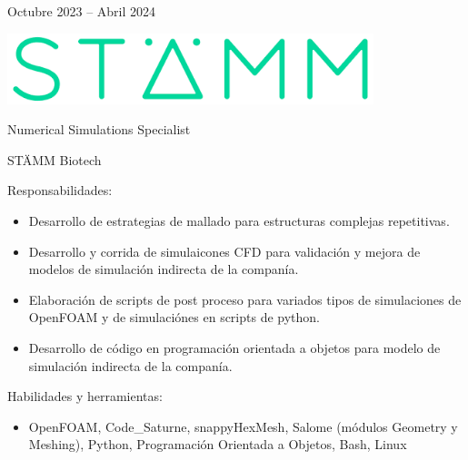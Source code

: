 \documentclass[a4paper,10pt]{article}
\newlength{\cvcolumngapwidth}
\newlength{\cvleftcolumnwidth}
\newlength{\cvrightcolumnwidth}
\newcommand{\cvtitlestyle}[1]{{\large\cvtitlefont\textcolor{cvtitlecolor}{#1}}}
\newcommand{\cvsubtitlestyle}[1]{{\cvtitlefont\textcolor{cvtitlecolor}{#1}}}
\newcommand{\cvdurationstyle}[1]{{\small\cvdurationfont\textcolor{cvdurationcolor}{#1}}}
\newlength{\cvafteritemskipamount}
\newlength{\cvaftertitleskipamount}
\newlength{\cvparskip}
\newcommand{\cvitem}[2]{
    \begin{minipage}[t]{\cvleftcolumnwidth}
        \raggedleft #1
    \end{minipage}%
    \hspace{\cvcolumngapwidth}%
    \begin{minipage}[t]{\cvrightcolumnwidth}
        \setlength{\parskip}{\cvparskip} #2
    \end{minipage}

    \vspace{\cvafteritemskipamount}
}
\newcommand{\cvtitle}[1]{
    \cvtitlestyle{#1}

    \vspace{\cvaftertitleskipamount}
    \vspace{-\cvparskip}
}
\begin{document}
\cvitem{
	\cvdurationstyle{Octubre 2023 -- Abril 2024}
}{
	\begin{minipage}{0.1\textwidth}
		\centering
		\includegraphics[width=0.8\textwidth]{../logos-photos/Logo_STAMM.png}   
	\end{minipage}
	\cvtitle{Numerical Simulations Specialist}
	
	\cvsubtitlestyle{STÄMM Biotech}

    Responsabilidades:
    \begin{itemize}
        \item Desarrollo de estrategias de mallado para estructuras complejas repetitivas.
        \item Desarrollo y corrida de simulaicones CFD para validación y mejora de modelos de simulación
            indirecta de la companía.
        \item Elaboración de scripts de post proceso para variados tipos de simulaciones de OpenFOAM y de simulaciónes
            en scripts de python.
        \item Desarrollo de código en programación orientada a objetos para modelo de simulación indirecta de la
            companía.
    \end{itemize}

    Habilidades y herramientas:
    \begin{itemize}
        \item OpenFOAM, Code\_Saturne, snappyHexMesh, Salome (módulos Geometry y Meshing), Python, Programación
            Orientada a Objetos, Bash, Linux
    \end{itemize}
	
}
\end{document}
